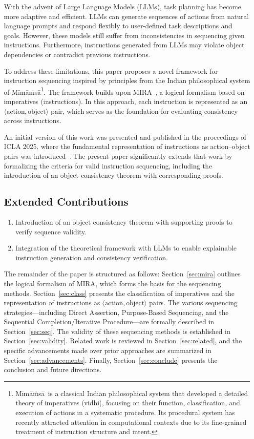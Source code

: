 \documentclass[a4paper,11pt]{lmcs}
\newcommand{\mimamsa}{M\={i}m\={a}\.ms\={a}}
\begin{document}
With the advent of Large Language Models (LLMs), task planning has become more adaptive and efficient. LLMs can generate sequences of actions from natural language prompts and respond flexibly to user-defined task descriptions and goals. However, these models still suffer from inconsistencies in sequencing given instructions. Furthermore, instructions generated from LLMs may violate object dependencies or contradict previous instructions.

To address these limitations, this paper proposes a novel framework for instruction sequencing inspired by principles from the Indian philosophical system of \mimamsa\footnote{\mimamsa~is a classical Indian philosophical system that developed a detailed theory of imperatives (vidhi), focusing on their function, classification, and execution of actions in a systematic procedure. Its procedural system has recently attracted attention in computational contexts due to its fine-grained treatment of instruction structure and intent.}. The framework builds upon MIRA~\cite{mira}, a logical formalism based on imperatives (instructions). In this approach, each instruction is represented as an \(\langle \text{action}, \text{object} \rangle\) pair, which serves as the foundation for evaluating consistency across instructions.

An initial version of this work was presented and published in the proceedings of ICLA 2025, where the fundamental representation of instructions as action–object pairs was introduced~\cite{llm_mira}. The present paper significantly extends that work by formalizing the criteria for valid instruction sequencing, including the introduction of an object consistency theorem with corresponding proofs.

\subsection*{Extended Contributions}
\begin{enumerate}
    \item Introduction of an object consistency theorem with supporting proofs to verify sequence validity.
    \item Integration of the theoretical framework with LLMs to enable explainable instruction generation and consistency verification.
\end{enumerate}

The remainder of the paper is structured as follows: Section~\ref{sec:mira} outlines the logical formalism of MIRA, which forms the basis for the sequencing methods. Section~\ref{sec:class} presents the classification of imperatives and the representation of instructions as \(\langle \text{action}, \text{object} \rangle\) pairs. The various sequencing strategies—including Direct Assertion, Purpose-Based Sequencing, and the Sequential Completion/Iterative Procedure—are formally described in Section~\ref{sec:seq}. The validity of these sequencing methods is established in Section~\ref{sec:validity}. Related work is reviewed in Section~\ref{sec:related}, and the specific advancements made over prior approaches are summarized in Section~\ref{sec:advancements}. Finally, Section~\ref{sec:conclude} presents the conclusion and future directions.
\end{document}
